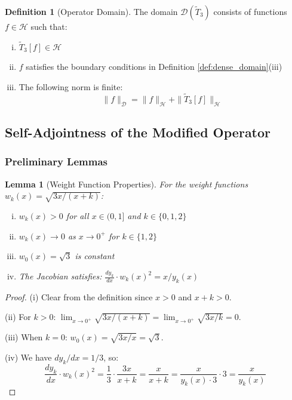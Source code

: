 \documentclass[12pt,letterpaper]{article}
\theoremstyle{plain}
\newtheorem{lemma}[theorem]{Lemma}
\theoremstyle{definition}
\newtheorem{definition}[theorem]{Definition}
\theoremstyle{remark}
\newcommand{\norm}[1]{\|#1\|}
\newcommand{\hilbert}{\mathcal{H}}
\newcommand{\domain}{\mathcal{D}}
\newcommand{\modifiedop}{\tilde{T}_3}
\begin{document}
\begin{definition}[Operator Domain]\label{def:op_domain}
The domain $\domain(\modifiedop)$ consists of functions $f \in \hilbert$ such that:
\begin{enumerate}[(i)]
\item $\modifiedop[f] \in \hilbert$
\item $f$ satisfies the boundary conditions in Definition \ref{def:dense_domain}(iii)
\item The following norm is finite:
\begin{equation}
\norm{f}_{\domain} = \norm{f}_{\hilbert} + \norm{\modifiedop[f]}_{\hilbert}
\end{equation}
\end{enumerate}
\end{definition}

\subsection{Self-Adjointness of the Modified Operator}

\subsubsection{Preliminary Lemmas}

\begin{lemma}[Weight Function Properties]\label{lem:weight_props}
For the weight functions $w_k(x) = \sqrt{3x/(x+k)}$:
\begin{enumerate}[(i)]
\item $w_k(x) > 0$ for all $x \in (0,1]$ and $k \in \{0,1,2\}$
\item $w_k(x) \to 0$ as $x \to 0^+$ for $k \in \{1,2\}$
\item $w_0(x) = \sqrt{3}$ is constant
\item The Jacobian satisfies: $\frac{dy_k}{dx} \cdot w_k(x)^2 = x/y_k(x)$
\end{enumerate}
\end{lemma}

\begin{proof}
(i) Clear from the definition since $x > 0$ and $x + k > 0$.

(ii) For $k > 0$: $\lim_{x \to 0^+} \sqrt{3x/(x+k)} = \lim_{x \to 0^+} \sqrt{3x/k} = 0$.

(iii) When $k = 0$: $w_0(x) = \sqrt{3x/x} = \sqrt{3}$.

(iv) We have $dy_k/dx = 1/3$, so:
\begin{equation}
\frac{dy_k}{dx} \cdot w_k(x)^2 = \frac{1}{3} \cdot \frac{3x}{x+k} = \frac{x}{x+k} = \frac{x}{y_k(x) \cdot 3} \cdot 3 = \frac{x}{y_k(x)}
\end{equation}
\end{proof}
\end{document}
